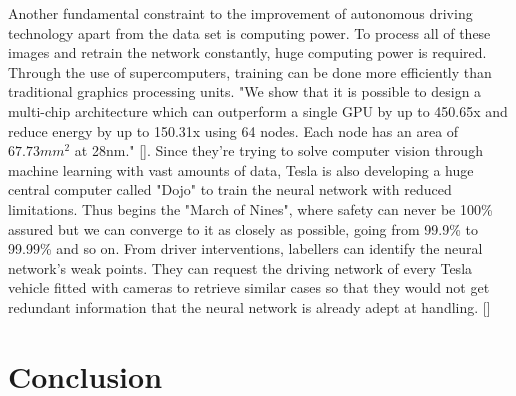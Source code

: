 \documentclass{article}
\begin{document}
Another fundamental constraint to the improvement of autonomous driving technology apart from the data set is computing power. To process all of these images and retrain the network constantly, huge computing power is required. Through the use of supercomputers, training can be done more efficiently than traditional graphics processing units. "We show that it is possible to design a multi-chip architecture which can outperform a single GPU by up to 450.65x and reduce energy by up to 150.31x using 64 nodes. Each node has an area of $67.73mm^2$ at 28nm." [\textcite{chen2014dadiannao}]. Since they're trying to solve computer vision through machine learning with vast amounts of data, Tesla is also developing a huge central computer called "Dojo" to train the neural network with reduced limitations. Thus begins the "March of Nines", where safety can never be 100\% assured but we can converge to it as closely as possible, going from 99.9\% to 99.99\% and so on. From driver interventions, labellers can identify the neural network's weak points. They can request the driving network of every Tesla vehicle fitted with cameras to retrieve similar cases so that they would not get redundant information that the neural network is already adept at handling. [\textcite{autonomyday}]

\section{Conclusion}

\printbibliography
\end{document}
